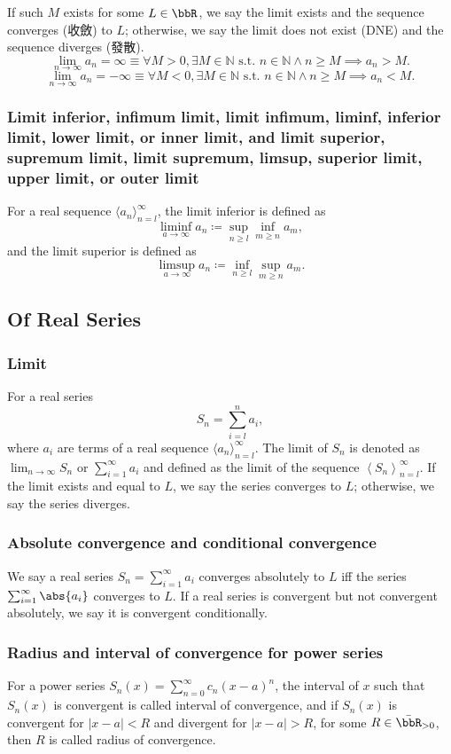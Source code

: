 \documentclass[a4paper,12pt]{report}
\begin{document}
If such $M$ exists for some $L\in\bbR$, we say the limit exists and the sequence converges (收斂) to $L$; otherwise, we say the limit does not exist (DNE) and the sequence diverges (發散).
\[\lim_{n\to \infty}a_n=\infty \equiv \forall M > 0, \exists M \in\mathbb{N} \text{\ s.t.\ } n\in\mathbb{N}\land n \geq M \implies a_n > M.\]
\[\lim_{n\to \infty}a_n=-\infty \equiv \forall M < 0, \exists M \in\mathbb{N} \text{\ s.t.\ } n\in\mathbb{N}\land n \geq M \implies a_n < M.\]
\subsubsection{Limit inferior, infimum limit, limit infimum, liminf, inferior limit, lower limit, or inner limit, and limit superior, supremum limit, limit supremum, limsup, superior limit, upper limit, or outer limit}
For a real sequence \(\langle a_n\rangle_{n=l}^{\infty}\), the limit inferior is defined as
\[\liminf_{a\to\infty}a_n\coloneq\sup_{n\geq l}\inf_{m\geq n}a_m,\]
and the limit superior is defined as
\[\limsup_{a\to\infty}a_n\coloneq\inf_{n\geq l}\sup_{m\geq n}a_m.\]
\subsection{Of Real Series}
\subsubsection{Limit}
For a real series
\[S_n = \sum_{i=l}^n a_i,\]
where \(a_i\) are terms of a real sequence \(\langle a_n\rangle_{n=l}^{\infty}\). The limit of \(S_n\) is denoted as \(\lim_{n\to\infty}S_n\) or \(\sum_{i=1}^{\infty}a_i\) and defined as the limit of the sequence \(\left\langle S_n\right\rangle_{n=l}^{\infty}\). If the limit exists and equal to $L$, we say the series converges to $L$; otherwise, we say the series diverges.
\subsubsection{Absolute convergence and conditional convergence}
We say a real series $S_n=\sum_{i=1}^{\infty}a_i$ converges absolutely to $L$ iff the series $\sum_{i=1}^{\infty}\abs{a_i}$ converges to $L$. If a real series is convergent but not convergent absolutely, we say it is convergent conditionally.
\subsubsection{Radius and interval of convergence for power series}
For a power series $S_n(x)=\sum_{n=0}^{\infty}c_n(x-a)^n$, the interval of $x$ such that $S_n(x)$ is convergent is called interval of convergence, and if $S_n(x)$ is convergent for $|x-a|<R$ and divergent for $|x-a|>R$, for some $R\in\bar{\bbR}_{>0}$, then $R$ is called radius of convergence.
\end{document}
